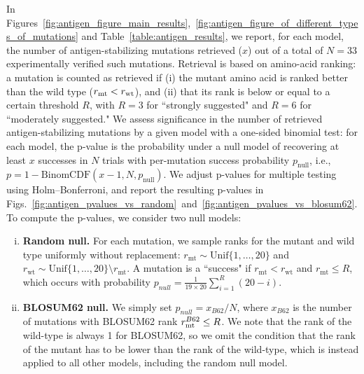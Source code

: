 In
Figures~\ref{fig:antigen_figure_main_results},~\ref{fig:antigen_figure_of_different_types_of_mutations}
and Table~\ref{table:antigen_results}, we report, for each model, the number of antigen-stabilizing
mutations retrieved ($x$) out of a total of $N=33$ experimentally verified such mutations. Retrieval
is based on amino-acid ranking: a mutation is counted as retrieved if (i) the mutant amino acid is
ranked better than the wild type ($r_{\text{mt}}<r_{\text{wt}}$), and (ii) that its rank is below or equal to a
certain threshold $R$, with $R=3$ for ``strongly suggested" and $R=6$ for ``moderately suggested."
We assess significance in the number of retrieved antigen-stabilizing mutations by a given model
with a one-sided binomial test: for each model, the p-value is the probability under a null model of
recovering at least $x$ successes in $N$ trials with per-mutation success probability
$p_{\text{null}}$, i.e., $p = 1-\text{BinomCDF}(x-1, N, p_{\text{null}})$. We adjust p-values for
multiple testing using Holm–Bonferroni, and report the resulting p-values in
Figs.~\ref{fig:antigen_pvalues_vs_random}~and~\ref{fig:antigen_pvalues_vs_blosum62}.\\
To compute the p-values, we consider two null models:
\begin{enumerate}[(i)]
    \item \textbf{Random null.} For each mutation, we sample ranks for the mutant and wild type
    uniformly without replacement: $r_{\mathrm{mt}}\sim \mathrm{Unif}\{1,\dots,20\}$ and
    $r_{\mathrm{wt}}\sim \mathrm{Unif}\{1,\dots,20\}\setminus{r_{\mathrm{mt}}}$. A mutation is a
    ``success" if $r_{\mathrm{mt}}<r_{\mathrm{wt}}$ and $r_{\mathrm{mt}}\leq R$, which occurs with
    probability $p_{null} = \frac{1}{19 \times 20}\sum_{i=1}^{R} (20 - i)$.\\
    \item \textbf{BLOSUM62 null.} We simply set $p_{null} = x_{B62} / N$, where $x_{B62}$ is the
    number of mutations with BLOSUM62 rank $r^{B62}_{\text{mt}} \leq R$. We note that the rank of the
    wild-type is always 1 for BLOSUM62, so we omit the condition that the rank of the mutant has to
    be lower than the rank of the wild-type, which is instead applied to all other models, including
    the random null model.
\end{enumerate}



